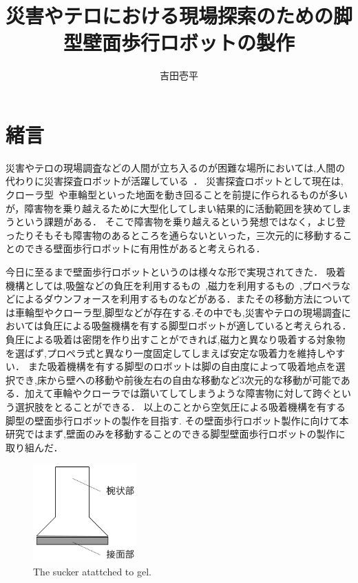 \documentclass[uplatex,dvipdfmx]{jlreq}
\title{災害やテロにおける現場探索のための脚型壁面歩行ロボットの製作}
\author{吉田壱平}
\begin{document}
\maketitle
\thispagestyle{empty}
\section{緒言}
災害やテロの現場調査などの人間が立ち入るのが困難な場所においては,人間の代わりに災害探査ロボットが活躍している~\cite{大須賀公一2004ヘビ型ロボットによる狭空間探索}．
災害探査ロボットとして現在は,クローラ型~\cite{高森年2003災害における罹災者発見とクローラ型ロボット}や車輪型といった地面を動き回ることを前提に作られるものが多いが，障害物を乗り越えるために大型化してしまい結果的に活動範囲を狭めてしまうという課題がある．
そこで障害物を乗り越えるという発想ではなく，よじ登ったりそもそも障害物のあるところを通らないといった，三次元的に移動することのできる壁面歩行ロボットに有用性があると考えられる．

今日に至るまで壁面歩行ロボットというのは様々な形で実現されてきた．
吸着機構としては,吸盤などの負圧を利用するもの~\cite{広瀬茂男1991四足壁面移動ロボット},磁力を利用するもの~\cite{高田洋吾2013立体的な環境で活動できる橋梁検査ロボットの開発},プロペラなどによるダウンフォースを利用するものなどがある．またその移動方法については車輪型やクローラ型,脚型などが存在する.その中でも,災害やテロの現場調査においては負圧による吸盤機構を有する脚型ロボットが適していると考えられる．
負圧による吸着は密閉を作り出すことができれば,磁力と異なり吸着する対象物を選ばず,プロペラ式と異なり一度固定してしまえば安定な吸着力を維持しやすい．
また吸着機構を有する脚型のロボットは脚の自由度によって吸着地点を選択でき,床から壁への移動や前後左右の自由な移動など3次元的な移動が可能である．加えて車輪やクローラでは躓いてしてしまうような障害物に対して跨ぐという選択肢をとることができる．
以上のことから空気圧による吸着機構を有する脚型の壁面歩行ロボットの製作を目指す.
その壁面歩行ロボット製作に向けて本研究ではまず,壁面のみを移動することのできる脚型壁面歩行ロボットの製作に取り組んだ．

\begin{figure}
    \centering
    \includegraphics[width=40mm]{./figure/model_sucker.png}
    \caption{The sucker atattched to gel.}
    \label{fig:model_sucker}
\end{figure}
\end{document}
